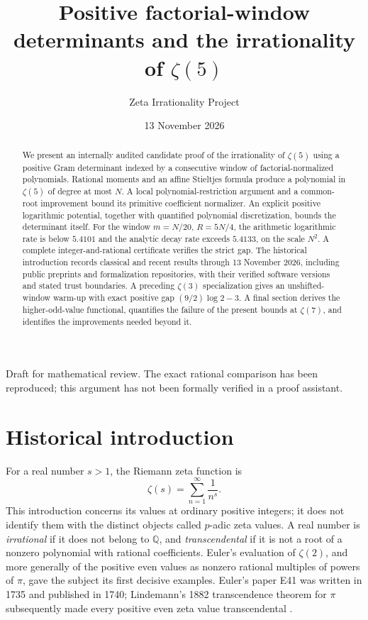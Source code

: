 \documentclass[11pt,letterpaper]{article}
\title{\textbf{Positive factorial-window determinants
and the irrationality of $\zeta(5)$}}
\author{Zeta Irrationality Project}
\date{13 November 2026}
\theoremstyle{definition}
\newcommand{\Q}{\mathbb Q}
\begin{document}
\maketitle
\begin{center}
\small Draft for mathematical review. The exact rational comparison has been
reproduced; this argument has not been formally verified in a proof assistant.
\end{center}
\begin{abstract}
We present an internally audited candidate proof of the irrationality of
$\zeta(5)$ using a positive Gram determinant indexed by a consecutive window
of factorial-normalized polynomials. Rational moments and an affine
Stieltjes formula produce a polynomial in $\zeta(5)$ of degree at most $N$.
A local polynomial-restriction argument and a common-root improvement bound
its primitive coefficient normalizer. An explicit positive logarithmic
potential, together with quantified polynomial discretization, bounds the
determinant itself. For the window $m=N/20$, $R=5N/4$, the arithmetic
logarithmic rate is below $5.4101$ and the analytic decay rate exceeds
$5.4133$, on the scale $N^2$. A complete integer-and-rational certificate
verifies the strict gap. The historical introduction records classical and
recent results through 13 November 2026, including public preprints and
formalization repositories, with their verified software versions and stated
trust boundaries. A preceding $\zeta(3)$ specialization gives an unshifted-window warm-up with exact positive gap $(9/2)\log 2-3$. A final section derives the higher-odd-value functional, quantifies the failure of the present bounds at $\zeta(7)$, and identifies the improvements needed beyond it.

\end{abstract}
\clearpage
\begingroup
\footnotesize
\setlength{\parskip}{0pt}
\tableofcontents
\endgroup
\clearpage

\section{Historical introduction}\label{sec:history}

For a real number $s>1$, the Riemann zeta function is
\[
  \zeta(s)=\sum_{n=1}^{\infty}\frac{1}{n^s}.
\]
This introduction concerns its values at ordinary positive integers; it does
not identify them with the distinct objects called $p$-adic zeta values.
A real number is \emph{irrational} if it does not belong to $\Q$, and
\emph{transcendental} if it is not a root of a nonzero polynomial with rational
coefficients.  Euler's evaluation of $\zeta(2)$, and more generally of the
positive even values as nonzero rational multiples of powers of $\pi$, gave
the subject its first decisive examples.  Euler's paper E41 was written in
1735 and published in 1740; Lindemann's 1882 transcendence theorem for $\pi$
subsequently made every positive even zeta value transcendental
\cite{euler1740,lindemann1882,dlmf}.
\end{document}
